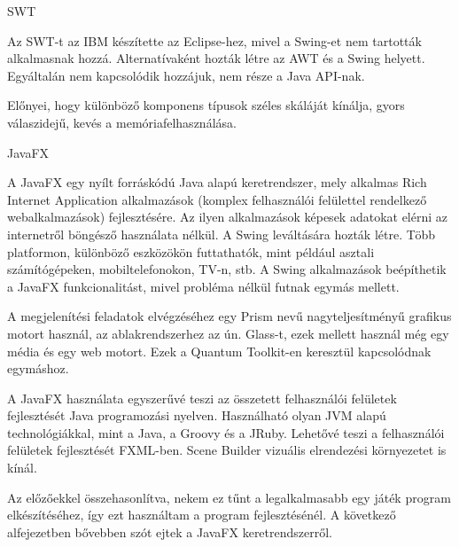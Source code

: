 SWT 

Az SWT-t az IBM készítette az Eclipse-hez, mivel a Swing-et nem tartották alkalmasnak hozzá. Alternatívaként hozták létre az AWT és a Swing helyett. Egyáltalán nem kapcsolódik hozzájuk, nem része a Java API-nak. 

Előnyei, hogy különböző komponens típusok széles skáláját kínálja, gyors válaszidejű, kevés a memóriafelhasználása. 

JavaFX 

A JavaFX egy nyílt forráskódú Java alapú keretrendszer, mely alkalmas Rich Internet Application alkalmazások (komplex felhasználói felülettel rendelkező webalkalmazások) fejlesztésére. Az ilyen alkalmazások képesek adatokat elérni az internetről böngésző használata nélkül. A Swing leváltására hozták létre. Több platformon, különböző eszközökön futtathatók, mint például asztali számítógépeken, mobiltelefonokon, TV-n, stb. A Swing alkalmazások beépíthetik a JavaFX funkcionalitást, mivel probléma nélkül futnak egymás mellett. 

A megjelenítési feladatok elvégzéséhez egy Prism nevű nagyteljesítményű grafikus motort használ, az ablakrendszerhez az ún. Glass-t, ezek mellett használ még egy média és egy web motort. Ezek a Quantum Toolkit-en keresztül kapcsolódnak egymáshoz. 

A JavaFX használata egyszerűvé teszi az összetett felhasználói felületek fejlesztését Java programozási nyelven. Használható olyan JVM alapú technológiákkal, mint a Java, a Groovy és a JRuby. Lehetővé teszi a felhasználói felületek fejlesztését FXML-ben. Scene Builder vizuális elrendezési környezetet is kínál. 

Az előzőekkel összehasonlítva, nekem ez tűnt a legalkalmasabb egy játék program elkészítéséhez, így ezt használtam a program fejlesztésénél. A következő alfejezetben bővebben szót ejtek a JavaFX keretrendszerről. 